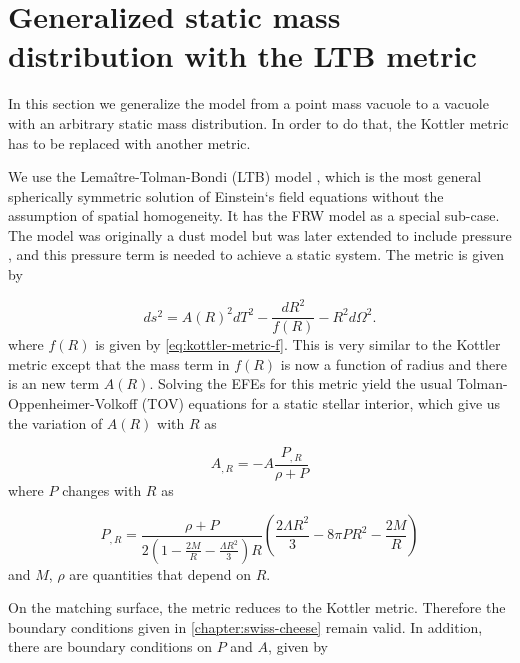 \chapter{Generalized static mass distribution with the LTB metric}
\label{appendix:ltb}

In this section we generalize the model from a point mass vacuole to a vacuole with an arbitrary static mass distribution. In order to do that, the Kottler metric has to be replaced with another metric. 

We use the Lema\^itre-Tolman-Bondi (LTB) model \citep{tolman1934effect,bondi1947spherically,lemaitre1933expansion}, which is the most general spherically symmetric solution of Einstein`s field equations without the assumption of spatial homogeneity. It has the FRW model as a special sub-case. The model was originally a dust model but was later extended to include pressure \citep{lasky2006generalized}, and this pressure term is needed to achieve a static system. The metric is given by

\begin{equation}
  ds^2 = A(R)^2 dT^2 - \frac{dR^2}{f(R)} - R^2 d \Omega^2.
  \label{eq:ltb-metric}
\end{equation}
where $f(R)$ is given by \autoref{eq:kottler-metric-f}. This is very similar to the Kottler metric except that the mass term in $f(R)$ is now a function of radius and there is an new term $A(R)$. Solving the EFEs for this metric yield the usual Tolman-Oppenheimer-Volkoff (TOV) equations \citep{tolman1939static,oppenheimer1939massive} for a static stellar interior, which give us the variation of $A(R)$ with $R$ as

\begin{equation}
  A_{,R} = - A \frac{P_{,R}}{\rho + P}
  \label{eq:alpha-evolution}
\end{equation}
where $P$ changes with $R$ as

\begin{equation}
  P_{,R} = \frac{\rho + P}{2\left (1- \frac{2M}{R} - \frac{\Lambda R^2}{3}\right )R}
  \left (\frac{2 \Lambda R^2}{3}  -8\pi PR^2 -\frac{2M}{R} \right ) 
  \label{eq:pressure-P-evolution}
\end{equation}
and $M$, $\rho$ are quantities that depend on $R$. 


On the matching surface, the metric reduces to the Kottler metric. Therefore the boundary conditions given in \autoref{chapter:swiss-cheese} remain valid. In addition, there are boundary conditions on $P$ and $A$, given by

